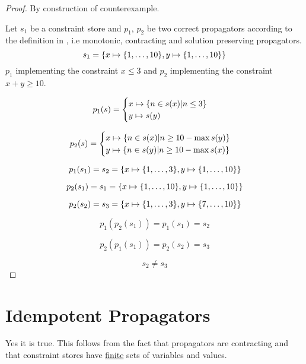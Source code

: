 \documentclass[a4paper, 11pt]{article}
\newcommand\mymapsto{\mathrel{\ooalign{$\rightarrow$\cr%
      \kern-.15ex\raise.275ex\hbox{\scalebox{1}[0.522]{$\mid$}}\cr}}}
\begin{document}
\begin{proof}
By construction of counterexample.

  Let $s_1$ be a constraint store and $p_1$, $p_2$ be two correct propagators according to the definition in \citep{schulte_notes}, i.e monotonic, contracting and solution preserving propagators.
  $$s_1 = \{x \mymapsto \{1, \ldots, 10\}, y \mymapsto \{1, \ldots, 10\} \}$$
  $p_1$ implementing the constraint $x \leq 3$ and $p_2$ implementing the constraint $x+y \geq 10$.

\begin{gather*}
p_{1}(s) = 
\begin{cases}
  x \mymapsto \{n \in s(x) | n \leq 3 \}\\
  y \mymapsto s(y)\\
\end{cases}
\end{gather*}

\begin{gather*}
p_{2}(s) = 
\begin{cases}
  x \mymapsto \{n \in s(x) | n \geq 10 - \max s(y) \}\\
  y \mymapsto \{n \in s(y) | n \geq 10 - \max s(x) \}\\
\end{cases}
\end{gather*}

$$p_1(s_1) = s_2 = \{x \mymapsto \{1, \ldots, 3\}, y \mymapsto \{1, \ldots, 10\} \}$$

$$p_2(s_1) = s_1 = \{x \mymapsto \{1, \ldots, 10\}, y \mymapsto \{1, \ldots, 10\} \}$$

$$p_2(s_2) = s_3 = \{x \mymapsto \{1, \ldots, 3\}, y \mymapsto \{7, \ldots, 10\} \}$$

$$p_1(p_2(s_1)) = p_1(s_1) = s_2$$

$$p_2(p_1(s_1)) = p_2(s_2) = s_3$$

$$s_2 \neq s_3$$
\end{proof}

\section*{Idempotent Propagators}
Yes it is true. This follows from the fact that propagators are contracting and that constraint stores have \underline{finite} sets of variables and values.
\end{document}
